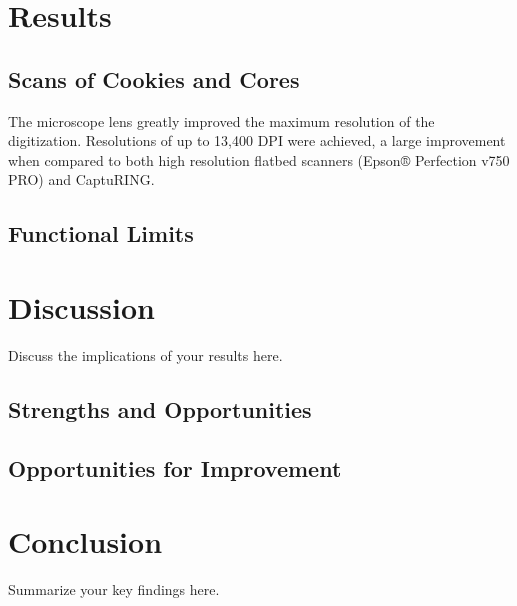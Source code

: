 \documentclass[a4paper,12pt]{article}
\begin{document}
\section{Results}
\subsection{Scans of Cookies and Cores}
The microscope lens greatly improved the maximum resolution of the digitization. Resolutions of up to 13,400 DPI were achieved, a large improvement when compared to 
both high resolution flatbed scanners (Epson® Perfection v750 PRO) and CaptuRING. 

\subsection{Functional Limits}

\section{Discussion}
Discuss the implications of your results here.

\subsection{Strengths and Opportunities}

\subsection{Opportunities for Improvement}

\section{Conclusion}
Summarize your key findings here.



\end{document}
